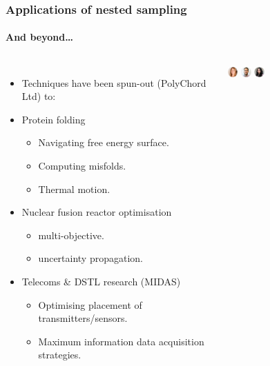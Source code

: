 \documentclass[aspectratio=169]{beamer}
\begin{document}
\begin{frame}
    \frametitle{Applications of nested sampling}
    \framesubtitle{And beyond\ldots}
    \begin{columns}
        \begin{itemize}
            \item Techniques have been spun-out (PolyChord Ltd) to:
            \item Protein folding
                \begin{itemize}
                    \item Navigating free energy surface.
                    \item Computing misfolds.
                    \item Thermal motion.
                \end{itemize}
            \item Nuclear fusion reactor optimisation
                \begin{itemize}
                    \item multi-objective.
                    \item uncertainty propagation.
                \end{itemize}
            \item Telecoms \& DSTL research (MIDAS)
                \begin{itemize}
                    \item Optimising placement of transmitters/sensors.
                    \item Maximum information data acquisition strategies.
                \end{itemize}
        \end{itemize}
        \includegraphics[width=0.08\textwidth]{people/catherine-watkinson-polychord.jpg}%
        \includegraphics[width=0.08\textwidth]{people/thomas-macaloone-polychord.jpg}%
        \includegraphics[width=0.08\textwidth]{people/parul-janagal-polychord.jpg}%

\end{columns}
\end{frame}
\end{document}
